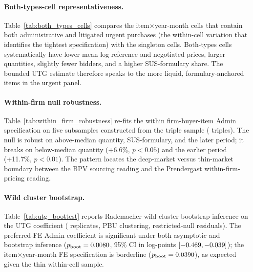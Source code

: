

\paragraph{Both-types-cell representativeness.}
Table~\ref{tab:both_types_cells} compares the \BPbothCellN{}
item$\times$year-month cells that contain both administrative and
litigated urgent purchases (the within-cell variation that
identifies the tightest specification) with the
\BPbothCellNSingleton{} singleton cells. Both-types cells
systematically have lower mean log reference and negotiated prices,
larger quantities, slightly fewer bidders, and a higher
SUS-formulary share. The bounded UTG estimate therefore speaks to
the more liquid, formulary-anchored items in the urgent panel.



\paragraph{Within-firm null robustness.}
Table~\ref{tab:within_firm_robustness} re-fits the within
firm-buyer-item Admin specification on five subsamples constructed
from the triple sample (\BPutgTripleCountUTG{} triples). The null
is robust on above-median quantity, SUS-formulary, and the later
period; it breaks on below-median quantity (+6.6\%, $p<0.05$) and
the earlier period (+11.7\%, $p<0.01$). The pattern locates the
deep-market versus thin-market boundary between the BPV sourcing
reading and the Prendergast within-firm-pricing reading.



\paragraph{Wild cluster bootstrap.}
Table~\ref{tab:utg_boottest} reports Rademacher wild cluster
bootstrap inference on the UTG coefficient (\BPutgBoottestB{}
replicates, PBU clustering, restricted-null residuals). The
preferred-FE Admin coefficient is significant under both asymptotic
and bootstrap inference ($p_{\text{boot}} = 0.0080$,
95\% CI in log-points $[-0.469, -0.039]$);
the item$\times$year-month FE specification is borderline
($p_{\text{boot}} = 0.0390$), as expected given the
thin within-cell sample.




